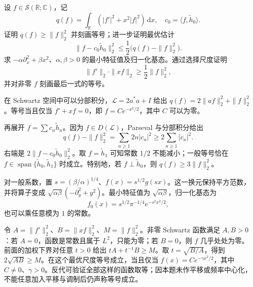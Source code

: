 \begin{exercise}\label{b2:ex:B2-ground-state}
设 \(f\in\mathcal S(\mathbb R;\mathbb C)\)，记
\[
 q(f)=\int_{\mathbb R}(|f'|^2+x^2|f|^2)\,\mathrm dx,
 \quad c_0=\langle f,\widetilde h_0\rangle.
\]
证明 \(q(f)\ge\|f\|_2^2\) 并刻画等号；进一步证明最优估计
\[
 \|f-c_0\widetilde h_0\|_2^2
 \le\frac12\bigl(q(f)-\|f\|_2^2\bigr).
\]
求 \(-\alpha\partial_x^2+\beta x^2\)、\(\alpha,\beta>0\) 的最小特征值及归一化基态。通过选择尺度证明
\[
 \|f'\|_2\cdot\|xf\|_2\ge\frac12\|f\|_2^2,
\]
并对非零 \(f\) 刻画最后一式的等号。
\end{exercise}
\begin{solution}
在 Schwartz 空间中可以分部积分，\(\mathcal L=2a^*a+I\) 给出
\(q(f)=2\|af\|_2^2+\|f\|_2^2\)。等号当且仅当 \(f'+xf=0\)，即 \(f=Ce^{-x^2/2}\)，其中 \(C\) 可以为零。

再展开 \(f=\sum c_n\widetilde h_n\)。因为 \(f\in D(\mathcal L)\)，Parseval 与分部积分给出
\[
 q(f)-\|f\|_2^2=\sum_{n\ge1}2n|c_n|^2
 \ge2\sum_{n\ge1}|c_n|^2.
\]
右端是 \(2\|f-c_0\widetilde h_0\|_2^2\)。取 \(f=\widetilde h_1\) 可知常数 \(1/2\) 不能减小；一般等号恰在 \(f\in\operatorname{span}\{\widetilde h_0,\widetilde h_1\}\) 时成立。特别地，若 \(f\perp\widetilde h_0\)，则 \(q(f)\ge3\|f\|_2^2\)。

对一般系数，置 \(s=(\beta/\alpha)^{1/4}\)、\(f(x)=s^{1/2}g(sx)\)。这一换元保持平方范数，并将算子变成 \(\sqrt{\alpha\beta}(-\partial_y^2+y^2)\)。最小特征值为 \(\sqrt{\alpha\beta}\)，归一化基态为
\[
 f_0(x)=s^{1/2}\pi^{-1/4}e^{-s^2x^2/2},
\]
也可以乘任意模为 \(1\) 的常数。

令 \(A=\|f'\|_2^2\)、\(B=\|xf\|_2^2\)、\(M=\|f\|_2^2\)。非零 Schwartz 函数满足 \(A,B>0\)：若 \(A=0\)，函数是常数且属于 \(L^2\)，只能为零；若 \(B=0\)，则 \(f\) 几乎处处为零。前面的加权下界对任意 \(t>0\) 给出 \(tA+t^{-1}B\ge M\)。取 \(t=\sqrt{B/A}\)，得到 \(2\sqrt{AB}\ge M\)。在这个最优尺度等号成立，当且仅当 \(f(x)=Ce^{-\gamma x^2/2}\)，其中 \(C\ne0\)、\(\gamma>0\)。反代可验证全部这样的函数取等；因本题未作平移或频率中心化，不能任意加入平移与调制后仍声称等号成立。
\end{solution}

